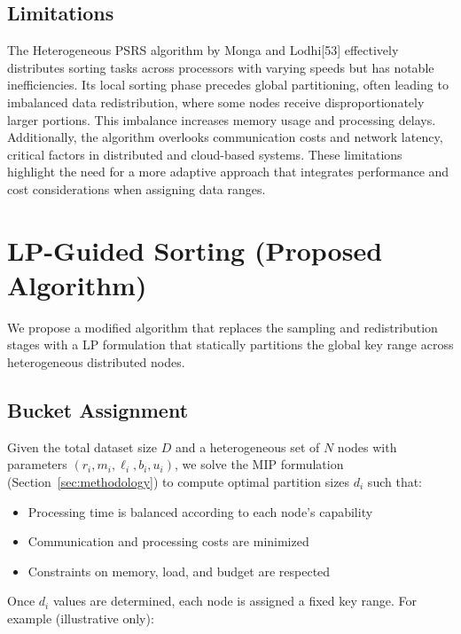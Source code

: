 \documentclass[]{interact}
\theoremstyle{plain}
\theoremstyle{definition}
\theoremstyle{remark}
\begin{document}
\subsection{Limitations}

The Heterogeneous PSRS algorithm by Monga and Lodhi[53] effectively distributes sorting tasks across processors with varying speeds but has notable inefficiencies. Its local sorting phase precedes global partitioning, often leading to imbalanced data redistribution, where some nodes receive disproportionately larger portions. This imbalance increases memory usage and processing delays. Additionally, the algorithm overlooks communication costs and network latency, critical factors in distributed and cloud-based systems. These limitations highlight the need for a more adaptive approach that integrates performance and cost considerations when assigning data ranges.






\section{LP-Guided Sorting (Proposed Algorithm)}

We propose a modified algorithm that replaces the sampling and redistribution stages with a LP formulation that statically partitions the global key range across heterogeneous distributed nodes.

\subsection{Bucket Assignment}

Given the total dataset size $D$ and a heterogeneous set of $N$ nodes with parameters $(r_i, m_i, \ell_i, b_i, u_i)$, we solve the MIP formulation (Section~\ref{sec:methodology}) to compute optimal partition sizes $d_i$ such that:

\begin{itemize}
    \item Processing time is balanced according to each node's capability
    \item Communication and processing costs are minimized
    \item Constraints on memory, load, and budget are respected
\end{itemize}

Once $d_i$ values are determined, each node is assigned a fixed key range. For example (illustrative only):
\end{document}
